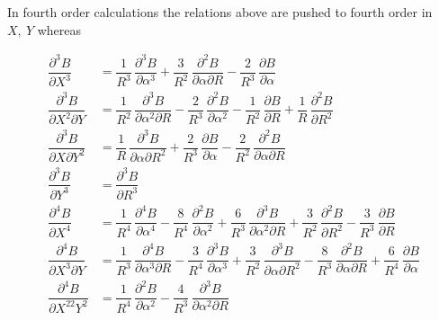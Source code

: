   \noindent In fourth order calculations the relations above are pushed to fourth order in $X, ~ Y$  
 whereas 

{\renewcommand{\arraystretch}{2}
 \begin{equation}
	 \begin{array}{ll}
		 \dfrac{ \partial^3 B }{ \partial X^3} 
		     & =  \dfrac{ 1}{R^3} \, \dfrac{\partial^3 B}{\partial \alpha^3} 
		       + \dfrac{3 }{R^2} \, \dfrac{\partial^2 B }{\partial \alpha \partial R} 
		       - \dfrac{2 }{ R^3} \, \dfrac{\partial B }{ \partial \alpha}\\  %
		 \dfrac{\partial^3 B }{ \partial X^2\partial Y} 
		     & =  \dfrac{1 }{ R^2} \, \dfrac{\partial^3 B }{\partial \alpha^ 2\partial R}
		       - \dfrac{2 }{ R^3} \, \dfrac{\partial^2 B }{ \partial \alpha^2} 
		       - \dfrac{1}{R^2} \, \dfrac{\partial B }{ \partial R} 
		       + \dfrac{1 }{ R} \, \dfrac{\partial^2 B }{ \partial R^2} \\  %
		 \dfrac{ \partial^3 B }{ \partial X\partial Y^2} 
		     & =  \dfrac{ 1 }{ R} \, \dfrac{\partial^3 B }{ \partial \alpha \partial R^2} 
		       + \dfrac{2 }{ R^3} \, \dfrac{\partial B }{\partial \alpha}  
		       - \dfrac{2 }{R^2} \, \dfrac{\partial^ 2B }{ \partial \alpha \partial R} \\ %
		 \dfrac{ \partial^3 B }{ \partial Y^3}
		     & =  \dfrac{ \partial^3 B }{ \partial R^3} \\ %
		\dfrac{\partial^4 B }{ \partial X^4}
		     & = \dfrac{ 1}{ R^4} \, \dfrac{\partial^4 B }{ \partial \alpha^4} 
		       - \dfrac{8 }{ R^4} \, \dfrac{\partial^2 B }{ \partial \alpha^2} 
		       + \dfrac{6 }{ R^3} \, \dfrac{\partial^3 B }{ \partial\alpha^2\partial R} 
		       + \dfrac{3 }{ R^2} \, \dfrac{\partial^2 B }{ \partial R^2} 
		       - \dfrac{3}{ R^3} \, \dfrac{\partial B }{ \partial R} \\ %
	     \dfrac{ \partial^4 B }{ \partial X^3\partial Y}
	         & =   \dfrac{ 1 }{ R^3} \, \dfrac{\partial^ 4B }{\partial \alpha^ 3\partial R} 
	           - \dfrac{3 }{ R^4} \, \dfrac{\partial^ 3B }{ \partial\alpha^ 3} 
	           + \dfrac{3 }{ R^2} \, \dfrac{\partial^3 B }{ \partial \alpha \partial R^2} 
	           - \dfrac{8 }{ R^3} \, \dfrac{\partial^2 B }{ \partial \alpha \partial R} 
	           + \dfrac{6 }{ R^4} \, \dfrac{\partial B }{ \partial \alpha} \\   %
	    \dfrac{ \partial^4 B}{ \partial X^22 Y^2} 
	         & =  \dfrac{ 1 }{ R^4} \, \dfrac{\partial^2 B }{ \partial \alpha^ 2} 
	           - \dfrac{4 }{ R^3} \, \dfrac{\partial^3 B }{ \partial \alpha^ 2\partial R} 

\end{array}
\end{equation}}
